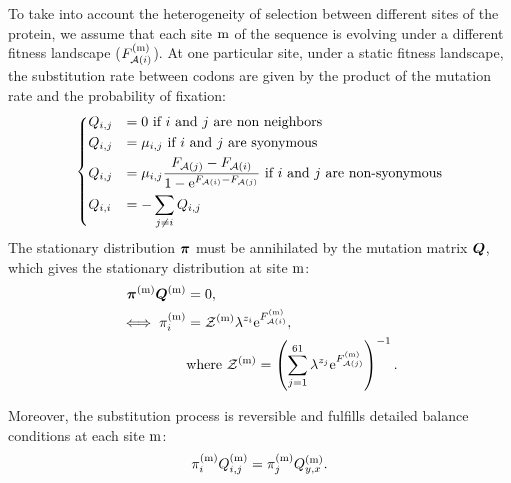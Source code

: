 To take into account the heterogeneity of selection between different sites of the protein, we assume that each site $\text{m}$ of the sequence is evolving under a different fitness landscape ($F_{\mathcal{A}({i})}^{(\text{m})}$).
At one particular site, under a static fitness landscape, the \gls{substitution} rate between \glspl{codon} are given by the product of the mutation rate and the probability of fixation:
\begin{equation}
    \begin{dcases}
        Q_{{i}, {j}} & = 0 \text{ if ${i}$ and ${j}$ are non neighbors} \\
        Q_{{i}, {j}} & = \mu_{{i}, {j}} \text{ if ${i}$ and ${j}$ are syonymous} \\
        Q_{{i}, {j}} & = \mu_{{i}, {j}} \dfrac{F_{\mathcal{A}({j})} - F_{\mathcal{A}({i})}}{1 - \mathrm{e}^{F_{\mathcal{A}({i})} - F_{\mathcal{A}({j})}} } \text{ if ${i}$ and ${j}$ are non-syonymous} \\
        Q_{{i}, {i}} & = - \sum_{{j} \neq {i}} Q_{{i}, {j}}
    \end{dcases}
    \label{codonSubRates}
\end{equation}
The stationary distribution $ \bm{\pi}$ must be annihilated by the mutation matrix $\bm{Q}$, which gives the stationary distribution at site $\text{m}$:
\begin{align}
    \bm{\pi}^{(\text{m})} \bm{Q}^{(\text{m})}
    & = 0 ,\\
    \iff \pi_{{i}}^{(\text{m})}
    & = \mathcal{Z}^{(\text{m})} \lambda^{{z}_{{i}}} \mathrm{e}^{F_{\mathcal{A}({i})}^{(\text{m})}},\\
    & \mathrm{ where } \ \mathcal{Z}^{(\text{m})} = \left( \sum_{{j}=1}^{61} \lambda^{{z}_{{j}}} \mathrm{e}^{F_{\mathcal{A}({j})}^{(\text{m})}} \right)^{-1}.
    \label{codonStationarity}
\end{align}

Moreover, the \gls{substitution} process is reversible and fulfills detailed balance conditions at each site $\text{m}$:
\begin{align}
    \pi_{{i}}^{(\text{m})} Q_{{i}, {j}}^{(\text{m})} = \pi_{{j}}^{(\text{m})} Q_{y, x}^{(\text{m})} .
    \label{codonSubBalance}
\end{align}

